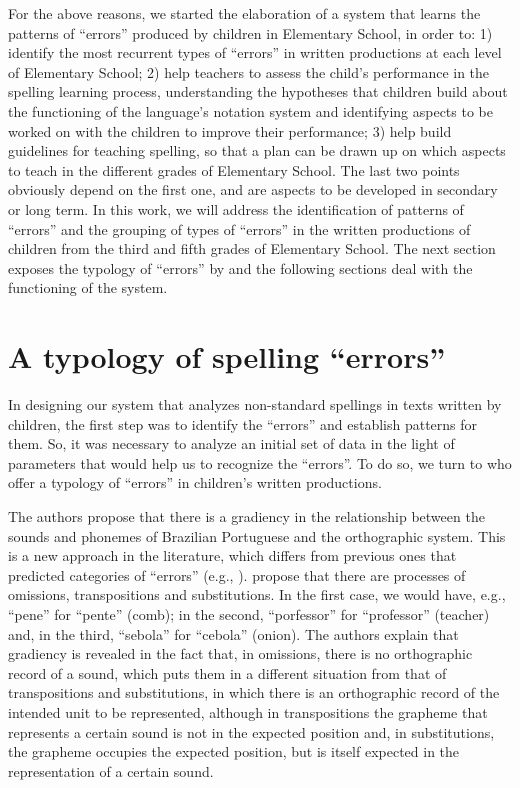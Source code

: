 For the above reasons, we started the elaboration of a system that learns the patterns of ``errors'' produced by children in Elementary School, in order to: 1) identify the most recurrent types of ``errors'' in written productions at each level of Elementary School; 2) help teachers to assess the child's performance in the spelling learning process, understanding the hypotheses that children build about the functioning of the language's notation system and identifying aspects to be worked on with the children to improve their performance; 3) help build guidelines for teaching spelling, so that a plan can be drawn up on which aspects to teach in the different grades of Elementary School. The last two points obviously depend on the first one, and are aspects to be developed in secondary or long term. In this work, we will address the identification of patterns of ``errors'' and the grouping of types of ``errors'' \citep{Chacon2018} in the written productions of children from the third and fifth grades of Elementary School. The next section exposes the typology of ``errors'' by \citet{Chacon2018} and the following sections deal with the functioning of the system.

\section{A typology of spelling ``errors''}

In designing our system that analyzes non-standard spellings in texts written by children, the first step was to identify the ``errors'' and establish patterns for them. So, it was necessary to analyze an initial set of data in the light of parameters that would help us to recognize the ``errors''. To do so, we turn to \citet{Chacon2018} who offer a typology of ``errors'' in children's written productions.

The authors propose that there is a gradiency in the relationship between the sounds and phonemes of Brazilian Portuguese and the orthographic system. This is a new approach in the literature, which differs from previous ones that predicted categories of ``errors'' (e.g., \citep{Lemle1982, Cagliari1990, Morais2000}). \citet{Chacon2018} propose that there are processes of omissions, transpositions and substitutions. In the first case, we would have, e.g., ``pene'' for ``pente'' (comb); in the second, ``porfessor'' for ``professor'' (teacher) and, in the third, ``sebola'' for ``cebola'' (onion). The authors explain that gradiency is revealed in the fact that, in omissions, there is no orthographic record of a sound, which puts them in a different situation from that of transpositions and substitutions, in which there is an orthographic record of the intended unit to be represented, although in transpositions the grapheme that represents a certain sound is not in the expected position and, in substitutions, the grapheme occupies the expected position, but is itself expected in the representation of a certain sound.

